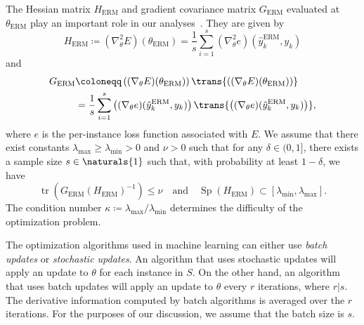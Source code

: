 \documentclass[11pt,a4paper]{article}
\numberwithin{equation}{section}
\newcommand{\tr}{\operatorname{tr}}
\begin{document}
The Hessian matrix $H_{\text{ERM}}$ and gradient covariance matrix
$G_{\text{ERM}}$ evaluated at $\theta_{\text{ERM}}$ play an important role in
our analyses~\citep{bousquet2008tradeoffs}. They are given by
\[
	H_{\text{ERM}} \coloneqq (\nabla_\theta^2 E)(\theta_{\text{ERM}})
	= \frac{1}{s} \sum_{i = 1}^s (\nabla_\theta^2 e)(\hat{y}_k^{\text{ERM}}, y_k)
\]
and
\begin{align*}
	G_{\text{ERM}}
	&\coloneqq \left((\nabla_\theta E)(\theta_{\text{ERM}})\right)
		\trans{\left((\nabla_\theta E)(\theta_{\text{ERM}})\right)} \\
	&= \frac{1}{s} \sum_{i = 1}^s
		\left((\nabla_\theta e)(\hat{y}_k^{\text{ERM}}, y_k)\right)
		\trans{\left((\nabla_\theta e)(\hat{y}_k^{\text{ERM}}, y_k)\right)},
\end{align*}
where $e$ is the per-instance loss function associated with $E$. We assume that
there exist constants $\lambda_{\text{max}} \geq \lambda_{\text{min}} > 0$ and
$\nu > 0$ such that for any $\delta \in (0, 1]$, there exists a sample size $s
\in \naturals{1}$ such that, with probability at least $1 - \delta$, we have
\[
	\tr(G_{\text{ERM}} (H_{\text{ERM}})^{-1}) \leq \nu \quad\text{and}\quad
	\operatorname{Sp}(H_{\text{ERM}}) \subset [\lambda_{\text{min}}, \lambda_{\text{max}}].
\]
The condition number $\kappa \coloneqq
\lambda_{\text{max}}/{\lambda_{\text{min}}}$ determines the difficulty of the
optimization problem.

The optimization algorithms used in machine learning can either use \emph{batch
updates} or \emph{stochastic updates}. An algorithm that uses stochastic updates
will apply an update to $\theta$ for each instance in $S$. On the other hand, an
algorithm that uses batch updates will apply an update to $\theta$ every $r$
iterations, where $r | s$. The derivative information computed by batch
algorithms is averaged over the $r$ iterations. For the purposes of our
discussion, we assume that the batch size is $s$.
\end{document}
